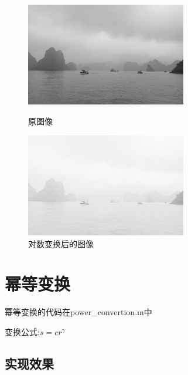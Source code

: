 \documentclass[11pt, a4paper, UTF8]{ctexart}
\begin{document}
\begin{figure}[H]
  \centering
  \begin{minipage}[t]{0.48\textwidth}
  \centering
  \includegraphics[width=7cm]{gray.jpg}
  \caption{原图像}
  \end{minipage}
  \begin{minipage}[t]{0.48\textwidth}
  \centering
  \includegraphics[width=7cm]{gray_log_converted.jpg}
  \caption{对数变换后的图像}
  \end{minipage}
\end{figure}


\section{幂等变换}
幂等变换的代码在power\_convertion.m中 \par
变换公式:$s = c r^{\gamma}$


\subsection{实现效果}
\end{document}
